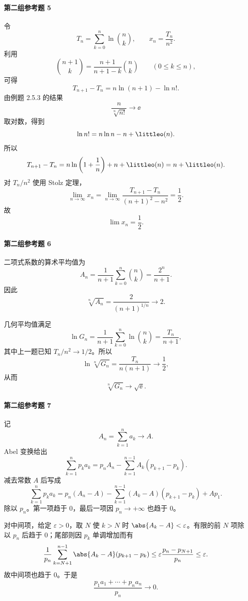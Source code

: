 \paragraph{第二组参考题 5}
\begin{xsolution}
令
\[
  T_n=\sum_{k=0}^n\ln\binom nk,
  \qquad x_n=\frac{T_n}{n^2}.
\]
利用
\[
  \binom{n+1}{k}=\frac{n+1}{n+1-k}\binom nk
  \qquad(0\le k\le n),
\]
可得
\[
  T_{n+1}-T_n
  =n\ln(n+1)-\ln n!.
\]
由例题 2.5.3 的结果
\[
  \frac n{\sqrt[n]{n!}}\to\ee
\]
取对数，得到
\[
  \ln n!=n\ln n-n+\littleo(n).
\]
所以
\[
  T_{n+1}-T_n
  =n\ln\left(1+\frac1n\right)+n+\littleo(n)
  =n+\littleo(n).
\]
对 $T_n/n^2$ 使用 Stolz 定理，
\[
  \lim_{n\to\infty}x_n
  =\lim_{n\to\infty}\frac{T_{n+1}-T_n}{(n+1)^2-n^2}
  =\frac12.
\]
故
\[
  \boxed{\lim x_n=\frac12}.
\]
\end{xsolution}

\paragraph{第二组参考题 6}
\begin{xsolution}
二项式系数的算术平均值为
\[
  A_n=\frac1{n+1}\sum_{k=0}^n\binom nk
  =\frac{2^n}{n+1}.
\]
因此
\[
  \sqrt[n]{A_n}=\frac2{(n+1)^{1/n}}\to2.
\]

几何平均值满足
\[
  \ln G_n=\frac1{n+1}\sum_{k=0}^n\ln\binom nk
  =\frac{T_n}{n+1},
\]
其中上一题已知 $T_n/n^2\to1/2$。所以
\[
  \ln\sqrt[n]{G_n}
  =\frac{T_n}{n(n+1)}\to\frac12,
\]
从而
\[
  \boxed{\sqrt[n]{G_n}\to\sqrt\ee}.
\]
\end{xsolution}

\paragraph{第二组参考题 7}
\begin{xsolution}
记
\[
  A_n=\sum_{k=1}^n a_k\to A.
\]
Abel 变换给出
\[
  \sum_{k=1}^n p_ka_k
  =p_nA_n-\sum_{k=1}^{n-1}A_k(p_{k+1}-p_k).
\]
减去常数 $A$ 后写成
\[
  \sum_{k=1}^n p_ka_k
  =p_n(A_n-A)
   -\sum_{k=1}^{n-1}(A_k-A)(p_{k+1}-p_k)
   +Ap_1.
\]
除以 $p_n$。第一项趋于 $0$，最后一项因 $p_n\to+\infty$ 也趋于 $0$。

对中间项，给定 $\varepsilon>0$，取 $N$ 使 $k>N$ 时 $\abs{A_k-A}<\varepsilon$。有限的前 $N$ 项除以 $p_n$ 后趋于 $0$；尾部则因 $p_k$ 单调增加而有
\[
  \frac1{p_n}\sum_{k=N+1}^{n-1}
  \abs{A_k-A}(p_{k+1}-p_k)
  \le\varepsilon\frac{p_n-p_{N+1}}{p_n}\le\varepsilon.
\]
故中间项也趋于 $0$。于是
\[
  \boxed{\frac{p_1a_1+\cdots+p_na_n}{p_n}\to0}.
\]
\end{xsolution}

